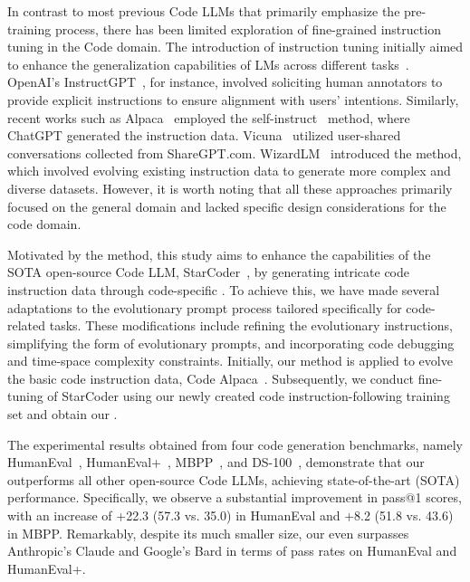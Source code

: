 In contrast to most previous Code LLMs that primarily emphasize the pre-training process, there has been limited exploration of fine-grained instruction tuning in the Code domain. The introduction of instruction tuning initially aimed to enhance the generalization capabilities of LMs across different tasks~\cite{t5,DBLP:conf/iclr/WeiBZGYLDDL22,flan-t5,ExT5,T0,ZeroPrompt,UnifiedQA}. OpenAI's InstructGPT~\cite{DBLP:conf/nips/Ouyang0JAWMZASR22}, for instance, involved soliciting human annotators to provide explicit instructions to ensure alignment with users' intentions. Similarly, recent works such as Alpaca~\cite{alpaca} employed the self-instruct~\cite{wang2022self} method, where ChatGPT generated the instruction data. Vicuna~\cite{vicuna2023} utilized user-shared conversations collected from ShareGPT.com. WizardLM~\cite{xu2023wizardlm} introduced the \name{} method, which involved evolving existing instruction data to generate more complex and diverse datasets. However, it is worth noting that all these approaches primarily focused on the general domain and lacked specific design considerations for the code domain.

Motivated by the \name{} method, this study aims to enhance the capabilities of the SOTA open-source Code LLM, StarCoder~\cite{li2023starcoder}, by generating intricate code instruction data through code-specific \name{}. To achieve this, we have made several adaptations to the evolutionary prompt process tailored specifically for code-related tasks. These modifications include refining the evolutionary instructions, simplifying the form of evolutionary prompts, and incorporating code debugging and time-space complexity constraints. Initially, our method is applied to evolve the basic code instruction data, Code Alpaca~\cite{codealpaca}. Subsequently, we conduct fine-tuning of StarCoder using our newly created code instruction-following training set and obtain our \modelname{}.

The experimental results obtained from four code generation benchmarks, namely HumanEval~\cite{humeval}, HumanEval+~\cite{humanevalp}, MBPP~\cite{MBPP}, and DS-100~\cite{DS1000}, demonstrate that our \modelname{} outperforms all other open-source Code LLMs, achieving state-of-the-art (SOTA) performance. Specifically, we observe a substantial improvement in pass@1 scores, with an increase of +22.3 (57.3 vs. 35.0) in HumanEval and +8.2 (51.8 vs. 43.6) in MBPP. Remarkably, despite its much smaller size, our \modelname{} even surpasses Anthropic's Claude and Google's Bard in terms of pass rates on HumanEval and HumanEval+.

